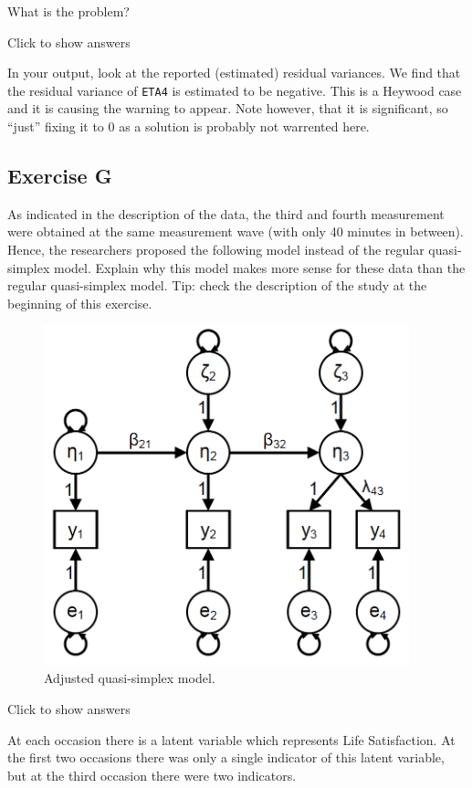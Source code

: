 \documentclass[
]{book}
\begin{document}
What is the problem?

Click to show answers

In your output, look at the reported (estimated) residual variances. We find that the residual variance of \texttt{ETA4} is estimated to be negative. This is a Heywood case and it is causing the warning to appear. Note however, that it is significant, so ``just'' fixing it to 0 as a solution is probably not warrented here.

\hypertarget{exercise-g}{%
\subsection{Exercise G}\label{exercise-g}}

As indicated in the description of the data, the third and fourth measurement were obtained at the same measurement wave (with only 40 minutes in between). Hence, the researchers proposed the following model instead of the regular quasi-simplex model. Explain why this model makes more sense for these data than the regular quasi-simplex model. Tip: check the description of the study at the beginning of this exercise.

\begin{figure}
\centering
\includegraphics[width=4.16667in,height=\textheight]{Simplex-adjusted.png}
\caption{Adjusted quasi-simplex model.}
\end{figure}

Click to show answers

At each occasion there is a latent variable which represents Life Satisfaction. At the first two occasions there was only a single indicator of this latent variable, but at the third occasion there were two indicators.
\end{document}
